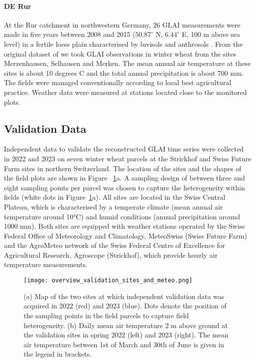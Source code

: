 \paragraph{DE Rur}
At the Rur catchment in northwestern Germany, 26 \gls{GLAI} measurements were made in five years between 2008 and 2015 ($50.87^\circ$ N, $6.44^\circ$ E, 100 m above sea level) in a fertile loess plain characterised by luvisols and anthrosols \citep{reichenau_comprehensive_2020}. From the original dataset of \cite{reichenau_comprehensive_2020} we took \gls{GLAI} observations in winter wheat from the sites Merzenhausen, Selhausen and Merken. The mean annual air temperature at these sites is about 10 degrees C and the total annual precipitation is about 700 mm. The fields were managed conventionally according to local best agricultural practice. Weather data were measured at stations located close to the monitored plots.

\subsection{Validation Data}
\label{subsec:validation-data}
Independent data to validate the reconstructed \gls{GLAI} time series were collected in 2022 and 2023 on seven winter wheat parcels at the Strickhof and Swiss Future Farm sites in northern Switzerland. The location of the sites and the shapes of the field plots are shown in Figure ~\ref{fig:map-validation-sites}a.  A sampling design of between three and eight sampling points per parcel was chosen to capture the heterogeneity within fields (white dots in Figure~\ref{fig:map-validation-sites}a). All sites are located in the Swiss Central Plateau, which is characterised by a temperate climate (mean annual air temperature around 10°C) and humid conditions (annual precipitation around 1000 mm). Both sites are equipped with weather stations operated by the Swiss Federal Office of Meteorology and Climatology, MeteoSwiss (Swiss Future Farm) and the AgroMeteo network of the Swiss Federal Centre of Excellence for Agricultural Research, Agroscope (Strickhof), which provide hourly air temperature measurements.

\begin{figure}[H]
    \centering
    \texttt{[image: overview\_validation\_sites\_and\_meteo.png]}
    \caption{(a) Map of the two sites at which independent validation data was acquired in 2022 (red) and 2023 (blue). Dots denote the position of the sampling points in the field parcels to capture field heterogeneity. (b) Daily mean air temperature 2 m above ground at the validation sites in spring 2022 (left) and 2023 (right). The mean air temperature between 1st of March and 30th of June is given in the legend in brackets.}
    \label{fig:map-validation-sites}
\end{figure}

